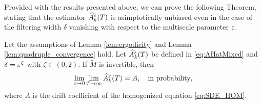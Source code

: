 \documentclass[10pt]{article}
\begin{document}
Provided with the results presented above, we can prove the following Theorem, stating that the estimator $\widehat A^\varepsilon_k(T)$ is asimptotically unbiased even in the case of the filtering width $\delta$ vanishing with respect to the multiscale parameter $\varepsilon$.

\begin{theorem}\label{thm:mainTheorem_zeta} Let the assumptions of Lemma \ref{lem:ergodicity} and Lemma \ref{lem:quadruple_convergence} hold. Let $\widehat A^\varepsilon_k(T)$ be defined in \eqref{eq:AHatMixed} and $\delta = \varepsilon^\zeta$ with $\zeta \in (0,2)$. If $\widetilde M$ is invertible, then
		\begin{equation}
		\lim_{\varepsilon \to 0} \lim_{T \to \infty} \widehat A_k^\varepsilon(T) = A, \quad \text{in probability},
		\end{equation}
		where $A$ is the drift coefficient of the homogenized equation \eqref{eq:SDE_HOM}.
\end{theorem}
\end{document}
